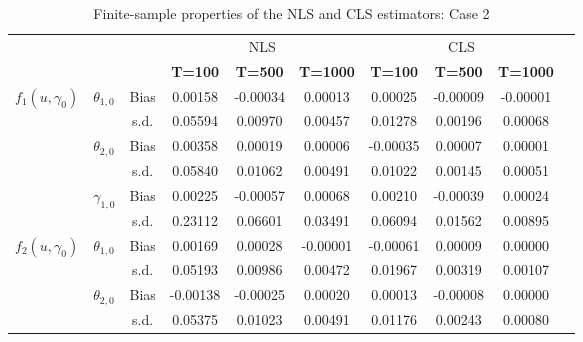 \documentclass[12pt,a4paper]{article}
\begin{document}
%	
	\begin{table}[htbp]
		\centering
		\caption{Finite-sample properties of the NLS and CLS estimators: Case 2}
		\begin{adjustbox}{max width=0.95\textwidth}
			\begin{tabular}{clcccccccc}
				\hline \hline
				&   &   & \multicolumn{3}{c}{NLS} & \multicolumn{3}{c}{CLS} \\
				& \multicolumn{1}{l}{} &   & \textbf{T=100} & \textbf{T=500} & \textbf{T=1000} & \textbf{T=100} & \textbf{T=500} & \textbf{T=1000} \\
				\hline
				\multirow{6}[1]{*}{$f_1(u,\gamma_{0})$} & \multirow{2}[1]{*}{$\theta_{1,0}$} & Bias & 0.00158 & -0.00034  & 0.00013 &  0.00025  & -0.00009 & -0.00001 \\
				&   & s.d. & 0.05594 & 0.00970 & 0.00457 & 0.01278 & 0.00196 & 0.00068 \\
				& \multirow{2}[0]{*}{$\theta_{2,0}$} & Bias & 0.00358 & 0.00019 & 0.00006 & -0.00035 & 0.00007 & 0.00001 \\
				&   & s.d. & 0.05840 & 0.01062 & 0.00491 & 0.01022 & 0.00145 & 0.00051 \\
				& \multirow{2}[0]{*}{$\gamma_{1,0}$} & Bias & 0.00225 & -0.00057 & 0.00068 & 0.00210 & -0.00039 & 0.00024 \\
				&   & s.d. & 0.23112 & 0.06601 & 0.03491 & 0.06094 & 0.01562 & 0.00895 \\
				\hline
				\multirow{6}[0]{*}{$f_2(u,\gamma_{0})$} & \multirow{2}[0]{*}{$\theta_{1,0}$} & Bias & 0.00169 & 0.00028 & -0.00001 & -0.00061 & 0.00009 & 0.00000 \\
				&   & s.d. & 0.05193 & 0.00986 & 0.00472 & 0.01967 & 0.00319 & 0.00107 \\
				& \multirow{2}[0]{*}{$\theta_{2,0}$} & Bias & -0.00138 & -0.00025 & 0.00020 & 0.00013 & -0.00008 & 0.00000 \\
				&   & s.d. & 0.05375 & 0.01023 & 0.00491 & 0.01176 & 0.00243 & 0.00080 \\

\end{tabular}
\end{adjustbox}
\end{table}
\end{document}
